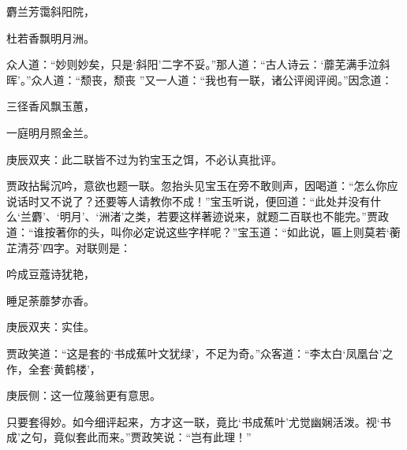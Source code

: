 \begin{poem}
    \begin{pl}    麝兰芳霭斜阳院，\end{pl}

    \begin{pl}    杜若香飘明月洲。\end{pl}
\end{poem}


\begin{parag}
    众人道：“妙则妙矣，只是‘斜阳’二字不妥。”那人道：“古人诗云：‘蘼芜满手泣斜晖’。”众人道：“颓丧，颓丧 ”又一人道：“我也有一联，诸公评阅评阅。”因念道：
\end{parag}


\begin{poem}
    \begin{pl}三径香风飘玉蕙，\end{pl}

    \begin{pl}一庭明月照金兰。\end{pl}
    \begin{note}庚辰双夹：此二联皆不过为钓宝玉之饵，不必认真批评。\end{note}
\end{poem}


\begin{parag}
    贾政拈髯沉吟，意欲也题一联。忽抬头见宝玉在旁不敢则声，因喝道：“怎么你应说话时又不说了？还要等人请教你不成！”宝玉听说，便回道：“此处并没有什么‘兰麝’、‘明月’、‘洲渚’之类，若要这样著迹说来，就题二百联也不能完。”贾政道：“谁按著你的头，叫你必定说这些字样呢？”宝玉道：“如此说，匾上则莫若‘蘅芷清芬’四字。对联则是：
\end{parag}


\begin{poem}
    \begin{pl}吟成豆蔻诗犹艳，\end{pl}
    \begin{pl}睡足荼蘼梦亦香。\end{pl}\begin{note}庚辰双夹：实佳。\end{note}
\end{poem}


\begin{parag}
    贾政笑道：“这是套的‘书成蕉叶文犹绿’，不足为奇。”众客道：“李太白‘凤凰台’之作，全套‘黄鹤楼’，\begin{note}庚辰侧：这一位蔑翁更有意思。\end{note}只要套得妙。如今细评起来，方才这一联，竟比‘书成蕉叶’尤觉幽娴活泼。视‘书成’之句，竟似套此而来。”贾政笑说：“岂有此理！”
\end{parag}



